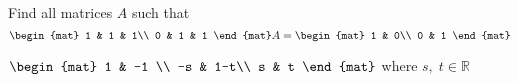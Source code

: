 
\begin{Exercise}[
name={},
title={}, 
difficulty=0,
origin={\cite{BS}}]
Find all matrices $A$ such that
\[
\begin{mat}
1 & 1 & 1\\
0 & 1 & 1
\end{mat}A=
\begin{mat}
1 & 0\\
0 & 1
\end{mat}
\]
\end{Exercise}

\begin{Answer}
$
\begin{mat}
1 & -1 \\
-s & 1-t\\
s & t
\end{mat}
$ where $s,\;t\in\mathbb{R}$
\end{Answer}
